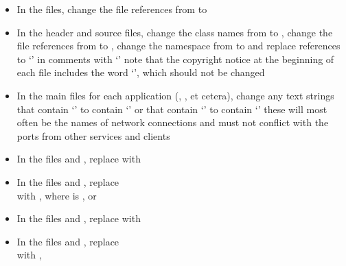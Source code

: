 \begin{itemize}
\item In the  files, change the file references from
 to 
\item\exSp{}In the  header and source files, change the class names from
 to , change the file references from
 to , change the namespace from
 to  and replace references to `' in
comments with `' \longDash{} note that the copyright notice at the beginning
of each file includes the word `', which should not be changed
\item\exSp{}In the main files for each application (,
, et cetera),
change any text strings that contain `' to contain `' or that
contain `' to contain `' \longDash{} these will most often be
the names of \yarp{} network connections and must not conflict with the ports from other
services and clients
\item\exSp{}In the files  and ,
replace
with\\
\item\exSp{}In the files  and
, replace\\
 with
,
where  is ,  or 
\item\exSp{}In the files  and ,
replace
with 
\item\exSp{}In the files  and ,
replace\\
with ,

\end{itemize}
